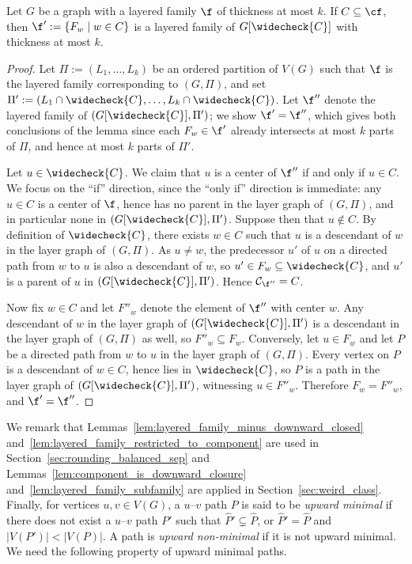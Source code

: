 \begin{lemma}\label{lem:layered_family_subfamily}
    Let $G$ be a graph with a layered family $\f$ of thickness at most $k$. If $C\subseteq \cf$, then $\f' := \{F_w \mid w\in C\}$ is a layered family of $G[\widecheck{C}]$ with thickness at most $k$.
\end{lemma}
\begin{proof}
    Let $\Pi := (L_1,\dots,L_k)$ be an ordered partition of $V(G)$ such that $\f$ is the layered family corresponding to $(G,\Pi)$, and set $\Pi' := (L_1\cap\widecheck{C},\dots,L_k\cap\widecheck{C})$. Let $\f''$ denote the layered family of $(G[\widecheck{C}],\Pi')$; we show $\f' = \f''$, which gives both conclusions of the lemma since each $F_w \in \f'$ already intersects at most $k$ parts of $\Pi$, and hence at most $k$ parts of $\Pi'$.

    Let $u \in \widecheck{C}$. We claim that $u$ is a center of $\f''$ if and only if $u \in C$. We focus on the ``if'' direction, since the ``only if'' direction is immediate: any $u \in C$ is a center of $\f$, hence has no parent in the layer graph of $(G,\Pi)$, and in particular none in $(G[\widecheck{C}],\Pi')$. Suppose then that $u \notin C$. By definition of $\widecheck{C}$, there exists $w \in C$ such that $u$ is a descendant of $w$ in the layer graph of $(G,\Pi)$. As $u \neq w$, the predecessor $u'$ of $u$ on a directed path from $w$ to $u$ is also a descendant of $w$, so $u' \in F_w \subseteq \widecheck{C}$, and $u'$ is a parent of $u$ in $(G[\widecheck{C}],\Pi')$. Hence $\mathcal{C}_{\f''} = C$.
    
    Now fix $w\in C$ and let $F''_w$ denote the element of $\f''$ with center $w$. Any descendant of $w$ in the layer graph of $(G[\widecheck{C}],\Pi')$ is a descendant in the layer graph of $(G,\Pi)$ as well, so $F''_w \subseteq F_w$. Conversely, let $u\in F_w$ and let $P$ be a directed path from $w$ to $u$ in the layer graph of $(G,\Pi)$. Every vertex on $P$ is a descendant of $w\in C$, hence lies in $\widecheck{C}$, so $P$ is a path in the layer graph of $(G[\widecheck{C}],\Pi')$, witnessing $u\in F''_w$. Therefore $F_w = F''_w$, and $\f' = \f''$.
\end{proof}


We remark that Lemmas~\ref{lem:layered_family_minus_downward_closed} and~\ref{lem:layered_family_restricted_to_component} are used in Section~\ref{sec:rounding_balanced_sep} and Lemmas~\ref{lem:component_is_downward_closure} and~\ref{lem:layered_family_subfamily} are applied in Section~\ref{sec:weird_class}. 
% 
Finally, for vertices $u,v \in V(G)$, a $u$--$v$ path $P$ is said to be \emph{upward minimal} if there does not exist a $u$--$v$ path $P'$ such that $\widehat{P}' \subsetneq \widehat{P}$, or $\widehat{P}' = \widehat{P}$ and $|V(P')| < |V(P)|$. A path is \emph{upward non-minimal} if it is not upward minimal. We need the following property of upward minimal paths.

